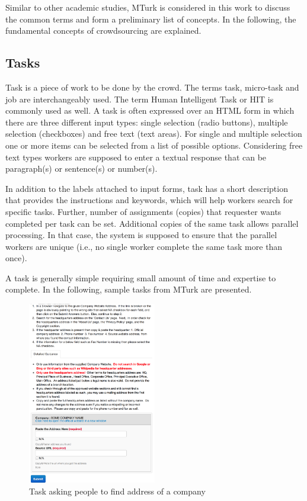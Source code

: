 Similar to other academic studies, MTurk is considered in this work to discuss 
the common terms and form a preliminary list of concepts. In the following, 
the fundamental concepts of crowdsourcing are explained.


\subsection{Tasks}
Task is a piece of work to be done by the crowd. The terms task, micro-task and job 
are interchangeably used. The term Human Intelligent Task or HIT is commonly 
used as well. A task is often expressed over an HTML form in which there are three 
different input types: single selection (radio buttons), multiple selection (checkboxes) 
and free text (text areas). For single and multiple selection one or more items can be 
selected from a list of possible options. Considering free text types workers are 
supposed to enter a textual response that can be paragraph(s) or sentence(s) 
or number(s).

In addition to the labels attached to input forms, task has a short description 
that provides the instructions and keywords, which will help workers search for 
specific tasks. Further, number of assignments (copies) that requester wants completed 
per task can be set. Additional copies of the same task allows parallel processing. 
In that case, the system is supposed to ensure that the parallel workers are unique 
(i.e., no single worker complete the same task more than once).

A task is generally simple requiring small amount of time and expertise to complete. 
In the following, sample tasks from MTurk are presented.

\begin{figure}[ht]
	\centering
	\includegraphics[width=0.5\textwidth]{figures/sample/address.png}
	\caption{Task asking people to find address of a company}
	\label{fig:sampleaddress}
\end{figure}

